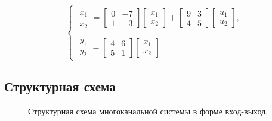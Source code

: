 \documentclass[a5paper, 10pt]{article}
\theoremstyle{definition}
\theoremstyle{plain}
\theoremstyle{remark}
\begin{document}
\begin{equation*}
\begin{cases}
\begin{matrix}
\dot{x}_1\\
\dot{x}_2
\end{matrix} =
\begin{bmatrix}
0 & -7\\
1 & -3
\end{bmatrix}
\begin{bmatrix}
x_1\\
x_2
\end{bmatrix} + 
\begin{bmatrix}
9 & 3\\
4 & 5
\end{bmatrix}
\begin{bmatrix}
u_1\\
u_2
\end{bmatrix},\\\\
\begin{matrix}
y_1\\
y_2
\end{matrix} =
 \begin{bmatrix}
4 & 6\\
5 & 1
\end{bmatrix}
\begin{bmatrix}
x_1\\
x_2
\end{bmatrix}
\end{cases}
\end{equation*}

\subsection{Структурная схема}
\begin{figure}[h]
\caption{Структурная схема многоканальной системы в форме вход-выход.}
\end{figure}
\end{document}
